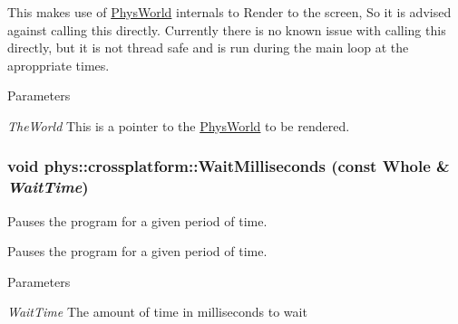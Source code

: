 This makes use of \hyperlink{classPhysWorld}{PhysWorld} internals to Render to the screen, So it is advised against calling this directly. Currently there is no known issue with calling this directly, but it is not thread safe and is run during the main loop at the aproppriate times. 
\begin{DoxyParams}{Parameters}
\item[{\em TheWorld}]This is a pointer to the \hyperlink{classPhysWorld}{PhysWorld} to be rendered. \end{DoxyParams}
\hypertarget{namespacephys_1_1crossplatform_ab5287fc10a132457a1309e1f5645347a}{
\subsubsection[{WaitMilliseconds}]{\setlength{\rightskip}{0pt plus 5cm}void phys::crossplatform::WaitMilliseconds (const Whole \& {\em WaitTime})}}
\label{d4/d59/namespacephys_1_1crossplatform_ab5287fc10a132457a1309e1f5645347a}


Pauses the program for a given period of time. 

Pauses the program for a given period of time. 
\begin{DoxyParams}{Parameters}
\item[{\em WaitTime}]The amount of time in milliseconds to wait \end{DoxyParams}
